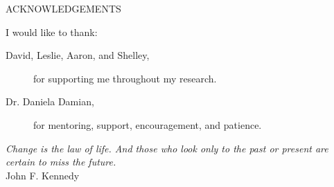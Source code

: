 \newpage
{}

\begin{center}
ACKNOWLEDGEMENTS
\end{center}

\noindent I would like to thank:
\begin{description}
\item[David, Leslie, Aaron, and Shelley,]
	for supporting me throughout my research.
\item[Dr. Daniela Damian,]
	for  mentoring, support, encouragement, and patience.
\end{description}

\begin{flushright}
\textit{Change is the law of life. And those who look only to the past or present are certain to miss the future.}
\\
John F. Kennedy \\
\end{flushright}
